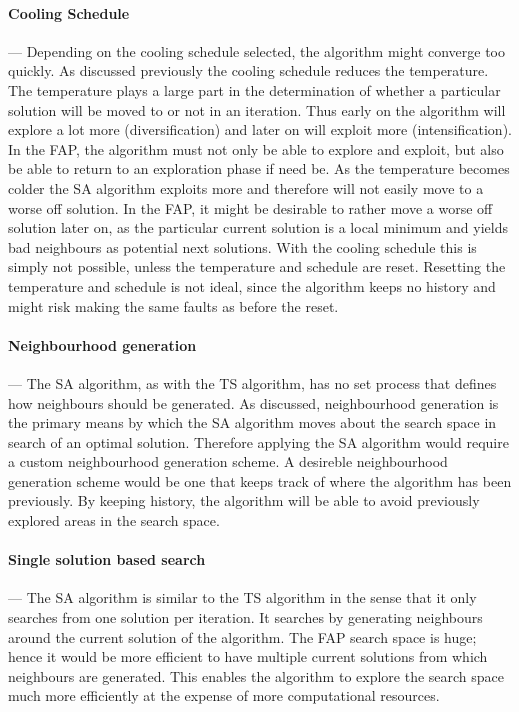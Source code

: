\paragraph{Cooling Schedule}
--- Depending on the cooling schedule selected, the algorithm might converge too quickly. As discussed previously the cooling schedule reduces the temperature. The temperature plays a large part in the determination of whether a particular solution will be moved to or not in an iteration. Thus early on the algorithm will explore a lot more (diversification) and later on will exploit more (intensification). In the FAP, the algorithm must not only be able to explore and exploit, but also be able to return to an exploration phase if need be.
As the temperature becomes colder the SA algorithm exploits more and therefore will not easily move to a worse off solution. In the FAP, it might be desirable to rather move a worse off solution later on, as the particular current solution is a local minimum and yields bad neighbours as potential next solutions. With the cooling schedule this is simply not possible, unless the temperature and schedule are reset. Resetting the temperature and schedule is not ideal, since the algorithm keeps no history and might risk making the same faults as before the reset.
\paragraph{Neighbourhood generation}
--- The SA algorithm, as with the TS algorithm, has no set process that defines how neighbours should be generated. As discussed, neighbourhood generation is the primary means by which the SA algorithm moves about the search space in search of an optimal solution. Therefore applying the SA algorithm would require a custom neighbourhood generation scheme. A desireble neighbourhood generation scheme would be one that keeps track of where the algorithm has been previously. By keeping history, the algorithm will be able to avoid previously explored areas in the search space.
\paragraph{Single solution based search}
--- The SA algorithm is similar to the TS algorithm in the sense that it only searches from one solution per iteration. It searches by generating neighbours around the current solution of the algorithm. The FAP search space is huge; hence it would be more efficient to have multiple current solutions from which neighbours are generated. This enables the algorithm to explore the search space much more efficiently at the expense of more computational resources.

